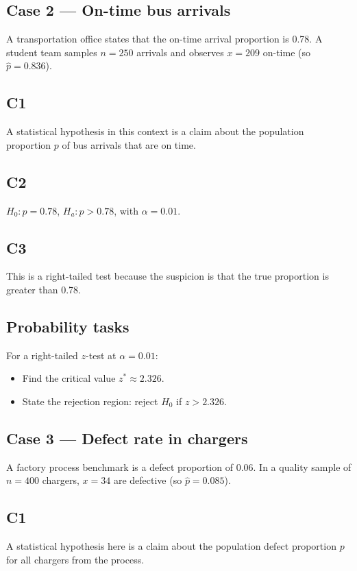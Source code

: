 \begin{ExamProblems}
		\item
		\subsection*{Case 2 — On-time bus arrivals}
		A transportation office states that the on-time arrival proportion is 0.78. A student team samples \(n=250\) arrivals and observes \(x=209\) on-time (so \(\hat p=0.836\)).

		\subsection*{C1}
		A statistical hypothesis in this context is a claim about the population proportion \(p\) of bus arrivals that are on time.

		\subsection*{C2}
		\(H_0\colon p=0.78\), \(H_a\colon p>0.78\), with \(\alpha=0.01\).

		\subsection*{C3}
		This is a right-tailed test because the suspicion is that the true proportion is greater than 0.78.

		\subsection*{Probability tasks}
		For a right-tailed \(z\)-test at \(\alpha=0.01\):
		\begin{itemize}
			\item Find the critical value \(z^*\approx 2.326\).
			\item State the rejection region: reject \(H_0\) if \(z>2.326\).
		\end{itemize}

		\item
		\subsection*{Case 3 — Defect rate in chargers}
		A factory process benchmark is a defect proportion of 0.06. In a quality sample of \(n=400\) chargers, \(x=34\) are defective (so \(\hat p=0.085\)).

		\subsection*{C1}
		A statistical hypothesis here is a claim about the population defect proportion \(p\) for all chargers from the process.


\end{ExamProblems}
